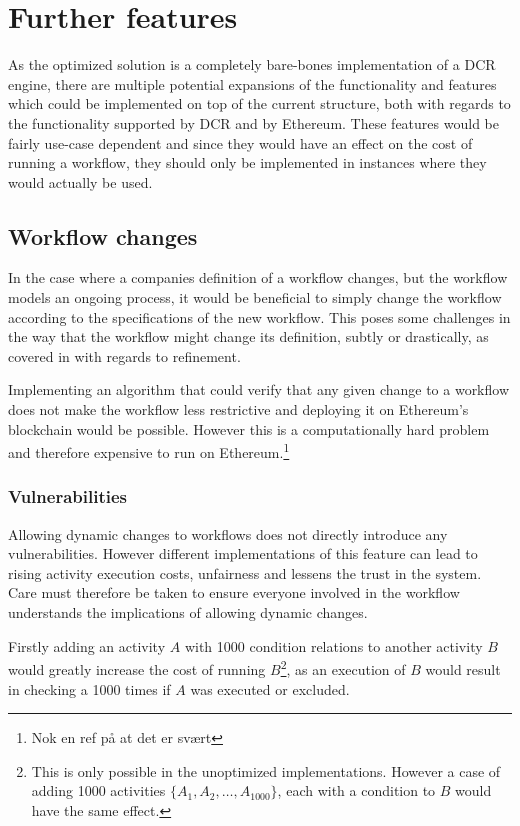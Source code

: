 \documentclass{article}
\begin{document}
	\section{Further features}
	As the optimized solution is a completely bare-bones implementation of a DCR engine, there are multiple potential expansions of the functionality and features which could be implemented on top of the current structure, both with regards to the functionality supported by DCR and by Ethereum.
	These features would be fairly use-case dependent and since they would have an effect on the cost of running a workflow, they should only be implemented in instances where they would actually be used.

		\subsection{Workflow changes}
		\label{sec:workflow-changes}

		In the case where a companies definition of a workflow changes, but the workflow models an ongoing process, it would be beneficial to simply change the workflow according to the specifications of the new workflow.
		This poses some challenges in the way that the workflow might change its definition, subtly or drastically, as covered in \cite{hierarchical-declarative-modelling} with regards to refinement.
		
		Implementing an algorithm that could verify that any given change to a workflow does not make the workflow less restrictive and deploying it on Ethereum's blockchain would be possible.
		However this is a computationally hard problem and therefore expensive to run on Ethereum.\footnote{Nok en ref på at det er svært}

			\subsubsection{Vulnerabilities}
			Allowing dynamic changes to workflows does not directly introduce any vulnerabilities. 
			However different implementations of this feature can lead to rising activity execution costs, unfairness and lessens the trust in the system. 
			Care must therefore be taken to ensure everyone involved in the workflow understands the implications of allowing dynamic changes.

			Firstly adding an activity $A$ with 1000 condition relations to another activity $B$ would greatly increase the cost of running $B$\footnote{This is only possible in the unoptimized implementations. However a case of adding 1000 activities $\{A_1, A_2, \dots, A_{1000}\}$, each with a condition to $B$ would have the same effect.}, as an execution of $B$ would result in checking a 1000 times if $A$ was executed or excluded. 
\end{document}
